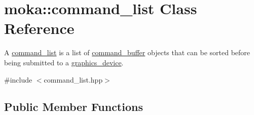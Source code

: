 \hypertarget{classmoka_1_1command__list}{}\section{moka\+::command\+\_\+list Class Reference}
\label{classmoka_1_1command__list}


A \mbox{\hyperlink{classmoka_1_1command__list}{command\+\_\+list}} is a list of \mbox{\hyperlink{classmoka_1_1command__buffer}{command\+\_\+buffer}} objects that can be sorted before being submitted to a \mbox{\hyperlink{classmoka_1_1graphics__device}{graphics\+\_\+device}}.  




{\ttfamily \#include $<$command\+\_\+list.\+hpp$>$}

\subsection*{Public Member Functions}

